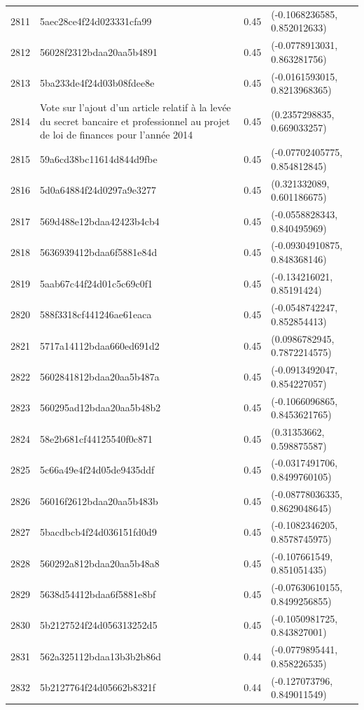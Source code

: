 \begin{table}[ht]
\begin{tabular}{rlrl}
  2811 & 5aec28ce4f24d023331cfa99 & 0.45 & (-0.1068236585, 0.852012633) \\ 
  2812 & 56028f2312bdaa20aa5b4891 & 0.45 & (-0.0778913031, 0.863281756) \\ 
  2813 & 5ba233de4f24d03b08fdee8e & 0.45 & (-0.0161593015, 0.8213968365) \\ 
  2814 & Vote sur l'ajout d'un article relatif à la levée du secret bancaire et professionnel au projet de loi de finances pour l'année 2014 & 0.45 & (0.2357298835, 0.669033257) \\ 
  2815 & 59a6cd38bc11614d844d9fbe & 0.45 & (-0.07702405775, 0.854812845) \\ 
  2816 & 5d0a64884f24d0297a9e3277 & 0.45 & (0.321332089, 0.601186675) \\ 
  2817 & 569d488e12bdaa42423b4cb4 & 0.45 & (-0.0558828343, 0.840495969) \\ 
  2818 & 5636939412bdaa6f5881e84d & 0.45 & (-0.09304910875, 0.848368146) \\ 
  2819 & 5aab67c44f24d01c5c69c0f1 & 0.45 & (-0.134216021, 0.85191424) \\ 
  2820 & 588f3318cf441246ae61eaca & 0.45 & (-0.0548742247, 0.852854413) \\ 
  2821 & 5717a14112bdaa660ed691d2 & 0.45 & (0.0986782945, 0.7872214575) \\ 
  2822 & 5602841812bdaa20aa5b487a & 0.45 & (-0.0913492047, 0.854227057) \\ 
  2823 & 560295ad12bdaa20aa5b48b2 & 0.45 & (-0.1066096865, 0.8453621765) \\ 
  2824 & 58e2b681cf44125540f0c871 & 0.45 & (0.31353662, 0.598875587) \\ 
  2825 & 5c66a49e4f24d05de9435ddf & 0.45 & (-0.0317491706, 0.8499760105) \\ 
  2826 & 56016f2612bdaa20aa5b483b & 0.45 & (-0.08778036335, 0.8629048645) \\ 
  2827 & 5bacdbcb4f24d036151fd0d9 & 0.45 & (-0.1082346205, 0.8578745975) \\ 
  2828 & 560292a812bdaa20aa5b48a8 & 0.45 & (-0.107661549, 0.851051435) \\ 
  2829 & 5638d54412bdaa6f5881e8bf & 0.45 & (-0.07630610155, 0.8499256855) \\ 
  2830 & 5b2127524f24d056313252d5 & 0.45 & (-0.1050981725, 0.843827001) \\ 
  2831 & 562a325112bdaa13b3b2b86d & 0.44 & (-0.0779895441, 0.858226535) \\ 
  2832 & 5b2127764f24d05662b8321f & 0.44 & (-0.127073796, 0.849011549) \\ 

\end{tabular}
\end{table}
